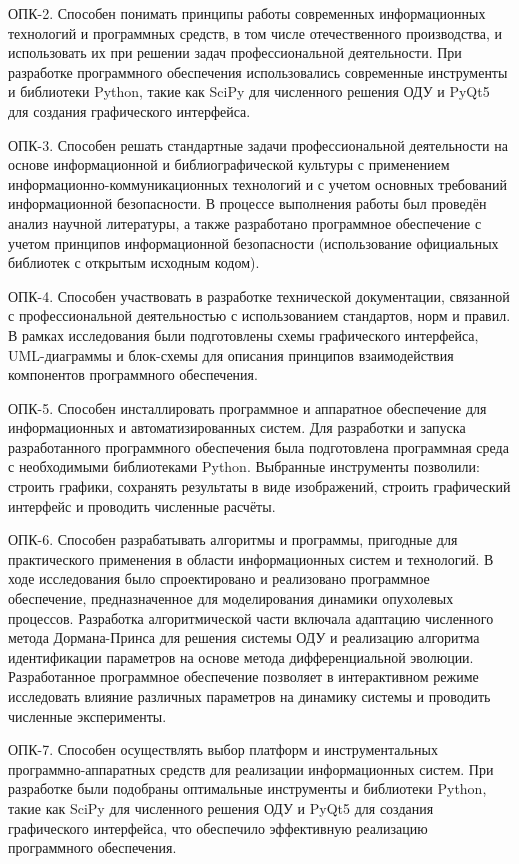 ОПК-2. Способен понимать принципы работы современных
информационных технологий и программных средств, в том числе
отечественного производства, и использовать их при решении задач
профессиональной деятельности. При разработке программного обеспечения
использовались современные инструменты и библиотеки Python, такие как SciPy для
численного решения ОДУ и PyQt5 для создания графического интерфейса.

ОПК-3. Способен решать стандартные задачи профессиональной
деятельности на основе информационной и библиографической культуры с
применением информационно-коммуникационных технологий и с учетом
основных требований информационной безопасности. В процессе выполнения работы
был проведён анализ научной литературы, а также разработано программное
обеспечение с учетом принципов информационной безопасности (использование
официальных библиотек с открытым исходным кодом).

ОПК-4. Способен участвовать в разработке технической документации,
связанной с профессиональной деятельностью с использованием стандартов,
норм и правил. В рамках исследования были подготовлены схемы графического
интерфейса, UML-диаграммы и блок-схемы для описания принципов взаимодействия
компонентов программного обеспечения.

ОПК-5. Способен инсталлировать программное и аппаратное обеспечение
для информационных и автоматизированных систем. Для разработки и запуска
разработанного программного обеспечения была подготовлена программная среда с
необходимыми библиотеками Python. Выбранные инструменты позволили: строить
графики, сохранять результаты в виде изображений, строить графический интерфейс
и проводить численные расчёты.

ОПК-6. Способен разрабатывать алгоритмы и программы, пригодные для
практического применения в области информационных систем и технологий. В ходе
исследования было спроектировано и реализовано программное обеспечение,
предназначенное для моделирования динамики опухолевых процессов. Разработка
алгоритмической части включала адаптацию численного метода Дормана-Принса для
решения системы ОДУ и реализацию алгоритма идентификации параметров на основе
метода дифференциальной эволюции. Разработанное программное обеспечение
позволяет в интерактивном режиме исследовать влияние различных параметров на
динамику системы и проводить численные эксперименты.

ОПК-7. Способен осуществлять выбор платформ и инструментальных
программно-аппаратных средств для реализации информационных систем. При
разработке были подобраны оптимальные инструменты и библиотеки Python, такие
как SciPy для численного решения ОДУ и PyQt5 для создания графического
интерфейса, что обеспечило эффективную реализацию программного обеспечения.

